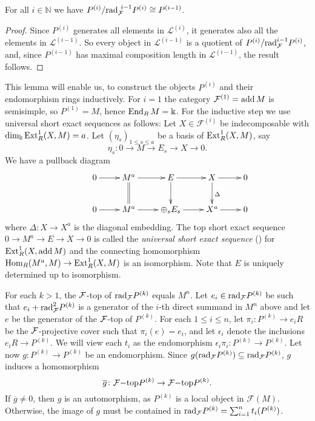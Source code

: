 \documentclass[10pt]{amsart}
\begin{document}
\begin{lemma} For all $i\in\mathbb{N}$ we have
 $P^{(i)}/\rad_{\mathcal F}^{\ i-1}P^{(i)} \cong P^{(i-1)}$.
\end{lemma}
\begin{proof} Since $P^{(i)}$ generates all elements in
$\mathcal L^{(i)}$, it generates also all
the elements in $\mathcal L^{(i-1)}$. So every object in $\mathcal L^{(i-1)}$
is a quotient of $P^{(i)}/{\mbox{rad}_{\mathcal F}^{i-1}P^{(i)}}$, and, since $P^{(i-1)}$ has maximal composition
length in $\mathcal L^{(i-1)}$, the result follows.
\end{proof}

\noindent This lemma will enable us, to construct the objects $P^{(i)}$ and their endomorphism rings
inductively. 
For $i=1$ the category $\mathcal F^{(1)}=\operatorname{add}{M}$ is semisimple,
so $P^{(1)} = M$, hence
$\operatorname{End}_RM = {\Bbbk}$. 
For the inductive step we use universal short exact sequences as follows:
Let $X\in \mathcal F^{(i)}$ be indecomposable with $\operatorname{dim}\nolimits_{\Bbbk}\operatorname{Ext}\nolimits_R^1(X,M)=a$.  Let $(\eta_{s})_{1\leq s\leq a}$ be
a basis of $\operatorname{Ext}\nolimits_R^1(X,M)$, say $$\eta_{s}: 0\to M \to E_{s}\to X\to 0.$$ 
We have a pullback diagram
$$ 
\xymatrix
{ &0\ar[r]&M^{a}\ar@{=}[d]
\ar[r] &E\ar[d]\ar[r]
&X\ar^{\Delta}[d] \ar[r] &0\\ &0 \ar[r]&M^{a}\ar[r]
&\oplus_{s}E_{s}\ar[r] &X^{ a}\ar[r]& 0} 
$$ 
where $\Delta : X\to X^{ a}$ is the diagonal embedding. The top short exact sequence $0\to M^{a}\to E\to X \to 0$ is called the {\em universal short exact sequence} (\cite{Bo}) for $\operatorname{Ext}\nolimits_R^1(X,\operatorname{add} M )$ and the connecting homomorphism 
$\operatorname{Hom}_R(M^{a},M)\to \operatorname{Ext}\nolimits_R^1(X,M)$ is an isomorphism.
Note that $E$ is uniquely determined up to isomorphism.

\begin{Remark}
 \noindent   For each $k>1$, the $\mathcal F$-top of $\mbox{rad}_{\mathcal F}P^{(k)}$ equals $M^n$. Let $e_i\in\mbox{rad}_{\mathcal F}P^{(k)}$ be such that $e_i+\mbox{rad}^2_{\mathcal F}P^{(k)}$ is a generator of the $i$-th direct  summand in $M^n$ above and let $e$ be the generator of the 
 $\mathcal F$-top of $P^{(k)}$. For each $1\le i\le n$, let $\pi_i\colon P^{(k)}\to e_iR$ be the $\mathcal F$-projective cover such that $\pi_i(e)=e_i$, and let $\epsilon_i$ denote the inclusions $e_iR\to P^{(k)}$. We will view each $t_i$ as the endomorphism $\epsilon_i\pi_i\colon P^{(k)}\rightarrow P^{(k)}$. Let now $g\colon P^{(k)}\to P^{(k)}$ be an endomorphism. Since $g(\mbox{rad}_{\mathcal F}P^{(k)})\subseteq\mbox{rad}_{\mathcal F}P^{(k)}$, $g$ induces a homomorphism $$\overline g\colon\mathcal F{\rm -top}P^{(k)}\to\mathcal F{\rm -top}P^{(k)}.$$ If $\overline g\neq 0$, then $g$ is an automorphism, as $P^{(k)}$ is a local object in $\mathcal F(M)$. Otherwise, the image of $g$ must be contained in $\mbox{rad}_{\mathcal F}P^{(k)}=\sum_{i=1}^nt_i(P^{(k)})$.
\end{Remark}
\end{document}
